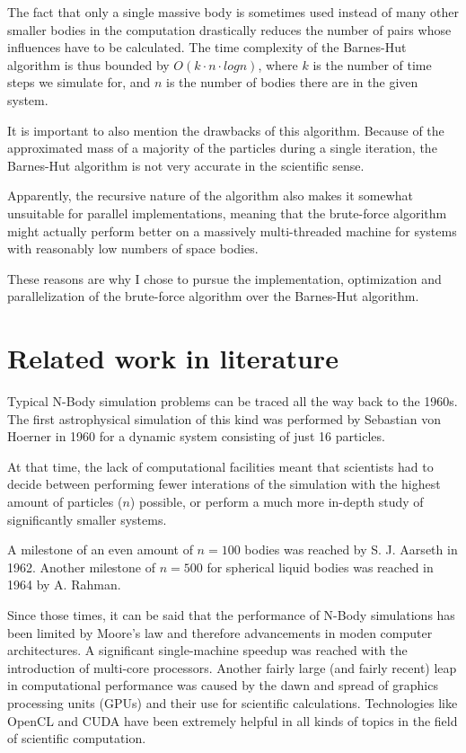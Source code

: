\documentclass[journal]{IEEEtran}
\begin{document}
		The fact that only a single massive body is sometimes used instead of many other smaller bodies in the computation drastically reduces the number of pairs whose influences have to be calculated. The time complexity of the Barnes-Hut algorithm is thus bounded by $O(k \cdot n \cdot log n)$, where $k$ is the number of time steps we simulate for, and $n$ is the number of bodies there are in the given system.
		
		It is important to also mention the drawbacks of this algorithm. Because of the approximated mass of a majority of the particles during a single iteration, the Barnes-Hut algorithm is not very accurate in the scientific sense. 
		
		Apparently, the recursive nature of the algorithm also makes it somewhat unsuitable for parallel implementations, meaning that the brute-force algorithm might actually perform better on a massively multi-threaded machine for systems with reasonably low numbers of space bodies.
		
		These reasons are why I chose to pursue the implementation, optimization and parallelization of the brute-force algorithm over the Barnes-Hut algorithm.
	
	\section{Related work in literature}
	
		Typical N-Body simulation problems can be traced all the way back to the 1960s. The first astrophysical simulation of this kind was performed by Sebastian von Hoerner in 1960 for a dynamic system consisting of just 16 particles. \cite{camb_book}
		
		At that time, the lack of computational facilities meant that scientists had to decide between performing fewer interations of the simulation with the highest amount of particles ($n$)  possible, or perform a much more in-depth study of significantly smaller systems.\cite{camb_book}
		
		A milestone of an even amount of $n=100$ bodies was reached by S. J. Aarseth in 1962. Another milestone of $n=500$ for spherical liquid bodies was reached in 1964 by A. Rahman. \cite{history}
		
		Since those times, it can be said that the performance of N-Body simulations has been limited by Moore’s law and therefore advancements in moden computer architectures. A significant single-machine speedup was reached with the introduction of multi-core processors. Another fairly large (and fairly recent) leap in computational performance was caused by the dawn and spread of graphics processing units (GPUs) and their use for scientific calculations. Technologies like OpenCL and CUDA have been extremely helpful in all kinds of topics in the field of scientific computation.
		
\end{document}

